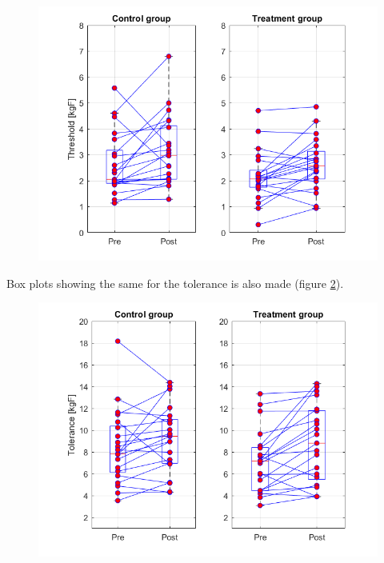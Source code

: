 \begin{figure}[H]                                         %
	\includegraphics[width=1\textwidth]{figures/boxplot_threshold_all.PNG}  %
	\caption{}
	\label{fig:boxplot_thres_all}  %
\end{figure}               %

Box plots showing the same for the tolerance is also made (figure \ref{fig:boxplot_tol_all}). 
\begin{figure}[H]                                         %
	\includegraphics[width=1\textwidth]{figures/boxplot_tolerance_all.PNG}  %
	\caption{}
	\label{fig:boxplot_tol_all}  %
\end{figure}               %

